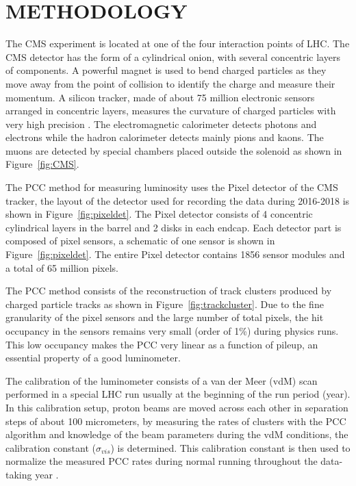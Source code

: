 \documentclass[final,12pt]{article}
\begin{document}
\section{METHODOLOGY}

The CMS experiment is located at one of the four interaction points of LHC.
The CMS detector has the form of a cylindrical onion, with several concentric layers of components.
A powerful magnet is used to bend charged particles as they move away from the point of collision to identify the charge and measure their momentum.
A silicon tracker, made of about 75 million electronic sensors arranged in concentric layers, measures the curvature of charged particles with very high precision \cite{Chatrchyan:2008aa}.
The electromagnetic calorimeter detects photons and electrons while the hadron calorimeter detects mainly pions and kaons.
The muons are detected by special chambers placed outside the solenoid as shown in Figure~\ref{fig:CMS}.

The PCC method for measuring luminosity uses the Pixel detector of the CMS tracker, the layout of the  detector used for recording the data during 2016-2018 is shown in Figure~\ref{fig:pixeldet}.
The Pixel detector consists of 4 concentric cylindrical layers in the barrel and 2 disks in each endcap.
Each detector part is composed of pixel sensors, a schematic of one sensor is shown in Figure~\ref{fig:pixeldet}.
The entire Pixel detector contains 1856 sensor modules and a total of 65 million pixels.

The PCC method consists of the reconstruction of track clusters produced by charged particle tracks as shown in Figure~\ref{fig:trackcluster}.
Due to the fine granularity of the pixel sensors and the large number of total pixels, the hit occupancy in the sensors remains very small (order of 1\%) during physics runs.
This low occupancy makes the PCC  very linear as a function of pileup, an essential property of a good luminometer.

The calibration of the luminometer consists of a van der Meer (vdM) scan performed in a special LHC run usually at the beginning of the run period (year).
In this calibration setup, proton beams are moved across each other in separation steps of about 100 micrometers,
by measuring the rates of clusters with the PCC algorithm and knowledge of the beam parameters during the vdM conditions, the calibration constant ($\sigma_{vis}$) is determined.
This calibration constant is then used to normalize the measured PCC rates during normal running throughout the data-taking year \cite{pas:2018vdm}.
\end{document}
